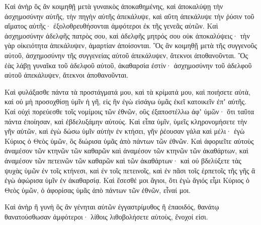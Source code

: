{Καὶ ἀνὴρ ὃς ἂν κοιμηθῇ μετὰ γυναικὸς ἀποκαθημένης, καὶ ἀποκαλύψῃ τὴν ἀσχημοσύνην αὐτῆς, τὴν πηγὴν αὐτῆς ἀπεκάλυψε, καὶ αὕτη ἀπεκάλυψε τὴν ῥύσιν τοῦ αἵματος αὐτῆς· ἐξολοθρευθήσονται ἀμφότεροι ἐκ τῆς γενεᾶς αὐτῶν.
Καὶ ἀσχημοσύνην ἀδελφῆς πατρὸς σου, καὶ ἀδελφῆς μητρός σου οὐκ ἀποκαλύψεις· τὴν γὰρ οἰκειότητα ἀπεκάλυψεν, ἁμαρτίαν ἀποίσονται.
Ὃς ἂν κοιμηθῇ μετὰ τῆς συγγενοῦς αὐτοῦ, ἀσχημοσύνην τῆς συγγενείας αὐτοῦ ἀπεκάλυψεν, ἄτεκνοι ἀποθανοῦνται.
Ὃς ἐὰς λάβῃ γυναῖκα τοῦ ἀδελφοῦ αὐτοῦ, ἀκαθαρσία ἐστίν· ἀσχημοσύνην τοῦ ἀδελφοῦ αὐτοῦ ἀπεκάλυψεν, ἄτεκνοι ἀποθανοῦνται.
\par }{\PP {}Καὶ φυλάξασθε πάντα τὰ προστάγματά μου, καὶ τὰ κρίματά μου, καὶ ποιήσετε αὐτὰ, καὶ οὐ μὴ προσοχθίσῃ ὑμῖν ἡ γῆ, εἰς ἣν ἐγὼ εἰσάγω ὑμᾶς ἐκεῖ κατοικεῖν ἐπʼ αὐτῆς.
Καὶ οὐχὶ πορεύεσθε τοῖς νομίμοις τῶν ἐθνῶν, οὓς ἐξαποστέλλω ἀφʼ ὑμῶν· ὅτι ταῦτα πάντα ἐποίησαν, καὶ ἐβδελυξάμην αὐτούς.
Καὶ εἶπα ὑμῖν, ὑμεῖς κληρονομήσετε τὴν γῆν αὐτῶν, καὶ ἐγὼ δώσω ὑμῖν αὐτὴν ἐν κτήσει, γῆν ῥέουσαν γάλα καὶ μέλι· ἐγὼ Κύριος ὁ Θεὸς ὑμῶν, ὃς διώρισα ὑμᾶς ἀπὸ πάντων τῶν ἐθνῶν.
Καὶ ἀφοριεῖτε αὐτοὺς ἀναμέσον τῶν κτηνῶν τῶν καθαρῶν καὶ ἀναμέσον τῶν κτηνῶν τῶν ἀκαθάρτων, καὶ ἀναμέσον τῶν πετεινῶν τῶν καθαρῶν καὶ τῶν ἀκαθάρτων· καὶ οὐ βδελύξετε τὰς ψυχὰς ὑμῶν ἐν τοῖς κτήνεσι, καὶ ἐν τοῖς πετεινοῖς, καὶ ἐν πᾶσι τοῖς ἑρπετοῖς τῆς γῆς ἃ ἐγὼ ἀφώρισα ὑμῖν ἐν ἀκαθαρσίᾳ.
Καὶ ἔσεσθέ μοι ἅγιοι, ὅτι ἐγὼ ἅγιός εἶμι Κύριος ὁ Θεὸς ὑμῶν, ὁ ἀφορίσας ὑμᾶς ἀπὸ πάντων τῶν ἐθνῶν, εἶναί μοι.
\par }{\PP {}Καὶ ἀνὴρ ἢ γυνὴ ὃς ἂν γένηται αὐτῶν ἐγγαστρίμυθος ἢ ἐπαοιδός, θανάτῳ θανατούσθωσαν ἀμφότεροι· λίθοις λιθοβολήσετε αὐτοὺς, ἔνοχοί εἰσι.

}
